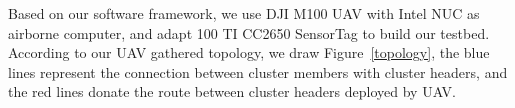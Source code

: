 Based on our software framework, we use DJI M100 UAV with Intel NUC as airborne
computer, and adapt 100 TI CC2650 SensorTag to build our testbed. According to
our UAV gathered topology, we draw Figure~\ref{topology}, the blue lines
represent the connection between cluster members with cluster headers, and the
red lines donate the route between cluster headers deployed by UAV.
